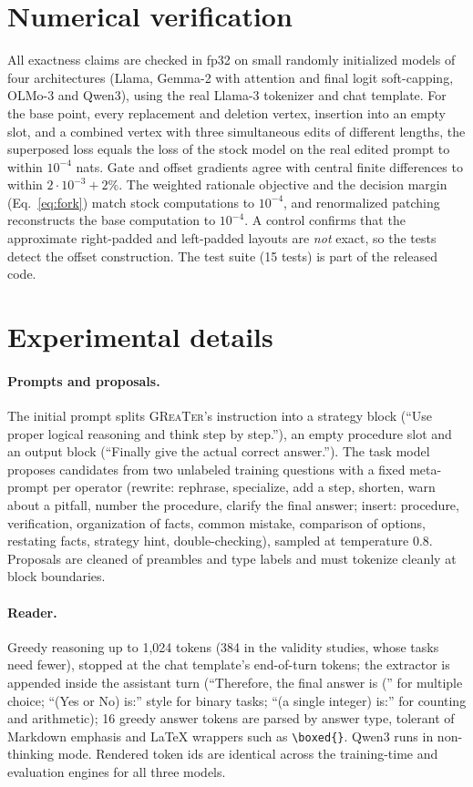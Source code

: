 \documentclass{article}
\newcommand{\greater}{\textsc{GReaTer}}
\begin{document}
\section{Numerical verification}
\label{app:tests}
All exactness claims are checked in fp32 on small randomly initialized models of four
architectures (Llama, Gemma-2 with attention and final logit soft-capping, OLMo-3 and
Qwen3), using the real Llama-3 tokenizer and chat template. For the base point, every
replacement and deletion vertex, insertion into an empty slot, and a combined vertex with
three simultaneous edits of different lengths, the superposed loss equals the loss of the
stock model on the real edited prompt to within $10^{-4}$ nats. Gate and offset gradients
agree with central finite differences to within $2\cdot10^{-3}+2\%$. The weighted
rationale objective and the decision margin (Eq.~\ref{eq:fork}) match stock computations
to $10^{-4}$, and renormalized patching reconstructs the base computation to $10^{-4}$.
A control confirms that the approximate right-padded and left-padded layouts are
\emph{not} exact, so the tests detect the offset construction. The test suite
(15 tests) is part of the released code.

\section{Experimental details}
\label{app:details}

\paragraph{Prompts and proposals.} The initial prompt splits \greater{}'s instruction into
a strategy block (``Use proper logical reasoning and think step by step.''), an empty
procedure slot and an output block (``Finally give the actual correct answer.''). The
task model proposes candidates from two unlabeled training questions with a fixed
meta-prompt per operator (rewrite: rephrase, specialize, add a step, shorten, warn about a
pitfall, number the procedure, clarify the final answer; insert: procedure, verification,
organization of facts, common mistake, comparison of options, restating facts, strategy
hint, double-checking), sampled at temperature 0.8. Proposals are cleaned of preambles and
type labels and must tokenize cleanly at block boundaries.

\paragraph{Reader.} Greedy reasoning up to 1{,}024 tokens (384 in the validity studies,
whose tasks need fewer), stopped at the chat template's end-of-turn tokens; the extractor
is appended inside the assistant turn (``Therefore, the final answer is ('' for
multiple choice; ``(Yes or No) is:'' style for binary tasks; ``(a single integer) is:''
for counting and arithmetic); 16 greedy answer tokens are parsed by answer type, tolerant
of Markdown emphasis and \LaTeX{} wrappers such as \verb|\boxed{}|. Qwen3 runs in
non-thinking mode. Rendered token ids are identical across the training-time and
evaluation engines for all three models.
\end{document}
